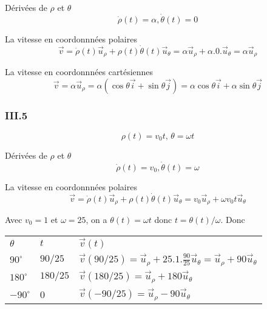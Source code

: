 \documentclass[]{book}
\theoremstyle{definition}
\begin{document}
D\'eriv\'ees de $\rho$ et $\theta$
$$\dot{\rho}(t) = \alpha, \dot{\theta}(t) = 0$$ 

La vitesse en coordonnn\'ees polaires
$$\vec{v} = \dot{\rho}(t)\vec{u}_{\rho} + \rho(t)\dot{\theta}(t)\vec{u}_{\theta} = \alpha\vec{u}_{\rho} + \alpha .0.\vec{u}_{\theta} = \alpha\vec{u}_{\rho}$$

La vitesse en coordonnn\'ees cart\'esiennes
$$\vec{v} = \alpha\vec{u}_{\rho} = \alpha(\cos\theta \vec{i} + \sin\theta\vec{j}) = \alpha\cos\theta \vec{i} + \alpha\sin\theta \vec{j}$$

\subsubsection*{III.5}
$$\rho(t) = v_{0} t,\, \theta=\omega t $$


D\'eriv\'ees de $\rho$ et $\theta$
$$\dot{\rho}(t) = v_{0}, \dot{\theta}(t) = \omega$$ 

La vitesse en coordonnn\'ees polaires
$$\vec{v} = \dot{\rho}(t)\vec{u}_{\rho} + \rho(t)\dot{\theta}(t)\vec{u}_{\theta} = v_{0}\vec{u}_{\rho} + \omega v_{0}t\vec{u}_{\theta}$$

Avec $v_{0} = 1$ et $\omega = 25$, on a $\theta(t) = \omega t$ donc $t = \theta(t)/\omega$. Donc

\begin{tabular}{l | l | l}
 $\theta$ & $t$ & $\vec{v}(t)$\\
 $90^{\circ}$ & $90/25 $ & $\vec{v}(90/25) = \vec{u}_{\rho} + 25.1.\frac{90}{25}\vec{u}_{\theta} = \vec{u}_{\rho} + 90\vec{u}_{\theta}$\\
 $180^{\circ}$ & $180/25$ & $\vec{v}(180/25) = \vec{u}_{\rho} + 180\vec{u}_{\theta}$ \\
 $-90^{\circ}$ & 0 & $\vec{v}(-90/25) = \vec{u}_{\rho} - 90\vec{u}_{\theta}$ \\
\end{tabular}
\end{document}

